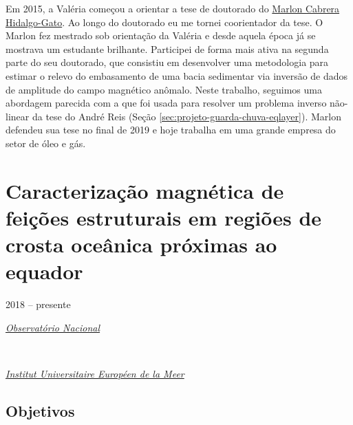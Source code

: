 \bigskip

\noindent Em 2015, a Valéria começou a orientar a tese de doutorado do
\href{https://lattes.cnpq.br/4057248251995225}{Marlon Cabrera Hidalgo-Gato}.
Ao longo do doutorado eu me tornei coorientador da tese.
O Marlon fez mestrado sob orientação da Valéria e desde aquela época já se
mostrava um estudante brilhante. Participei de forma mais ativa na segunda parte do
seu doutorado, que consistiu em desenvolver uma metodologia para estimar o 
relevo do embasamento de uma bacia sedimentar via inversão de dados de amplitude
do campo magnético anômalo. Neste trabalho, seguimos uma abordagem parecida com a
que foi usada para resolver um problema inverso não-linear da tese do André Reis
(Seção \ref{sec:projeto-guarda-chuva-eqlayer}). Marlon defendeu sua tese no final 
de 2019 e hoje trabalha em uma grande empresa do setor de óleo e gás.

\clearpage

\section{Caracterização magnética de feições estruturais em regiões de crosta oceânica próximas ao equador} 
\label{sec:projeto-baixas-latitudes}

2018 -- presente
\vspace{0.3\baselineskip}\\
\noindent\parbox{0.03\textwidth}{\vspace{-0.2\baselineskip}\faUniversity} \href{https://www.gov.br/observatorio/pt-br}{\textsl{Observatório Nacional}}
\parbox{0.03\textwidth}{\vspace{-0.2\baselineskip} \hfill {}} \\
\noindent\parbox{0.03\textwidth}{\vspace{-0.2\baselineskip}\faUniversity}
\href{https://www-iuem.univ-brest.fr/}{\textsl{Institut Universitaire Européen de la Meer}}
\parbox{0.03\textwidth}{\vspace{-0.2\baselineskip} \hfill {}}

\subsection*{Objetivos}

